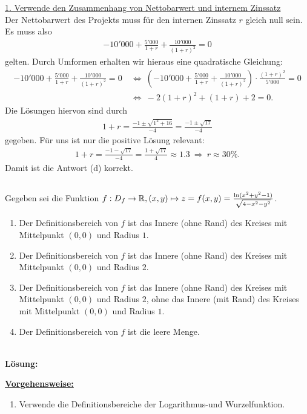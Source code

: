 \underline{1. Verwende den Zusammenhang von Nettobarwert und internem Zinssatz}\\
Der Nettobarwert des Projekts muss für den internen Zinssatz $ r $ gleich null sein.
Es muss also
\begin{align*}
	-10'000 + \frac{5'000}{1+ r} + \frac{10'000}{(1+r)^2} = 0
\end{align*}
gelten. Durch Umformen erhalten wir hieraus eine quadratische Gleichung:
\begin{align*}
	-10'000 + \frac{5'000}{1+ r} + \frac{10'000}{(1+r)^2} = 0
	\ &\Leftrightarrow \
	\left(
	-10'000 + \frac{5'000}{1+ r} + \frac{10'000}{(1+r)^2}
	\right)
	\cdot 
	\frac{(1+r)^2}{5'000}
	= 
	0\\
	\ &\Leftrightarrow \
	-2 (1+ r)^2 + (1+r) + 2
	= 
	0.
\end{align*}
Die Lösungen hiervon sind durch
\begin{align*}
	1+ r =
	\frac{-1 \pm \sqrt{1^2 + 16}}{-4}
	=
	\frac{-1 \pm \sqrt{17}}{-4}
\end{align*}
gegeben. Für uns ist nur die positive Lösung relevant:
\begin{align*}
	1+ r 
	= \frac{-1 -  \sqrt{17}}{-4} =
	\frac{1 +  \sqrt{17}}{4} 
	\approx 1.3
	\ \Rightarrow \
	r \approx 30 \%.
\end{align*}
Damit ist die Antwort (d) korrekt.
\newpage

\subsection*{}
Gegeben sei die Funktion $ f :D_f \to \mathbb{R}, (x,y) \mapsto z = f(x,y) = \frac{\ln(x^2 +y^2 -1)}{\sqrt{4 - x^2 - y^2}} $.
\renewcommand{\labelenumi}{(\alph{enumi})}
\begin{enumerate}
	\item 
	Der Definitionsbereich von $ f  $ ist das Innere (ohne Rand) des Kreises mit Mittelpunkt $ (0,0) $ und Radius $ 1 $.
	\item
	Der Definitionsbereich von $ f  $ ist das Innere (ohne Rand) des Kreises mit Mittelpunkt $ (0,0) $ und Radius $ 2 $.
	\item
	Der Definitionsbereich von $ f  $ ist das Innere (ohne Rand) des Kreises mit Mittelpunkt $ (0,0) $ und Radius $ 2 $, ohne das Innere (mit Rand) des Kreises mit Mittelpunkt $ (0,0) $ und Radius $ 1 $.
	\item
	Der Definitionsbereich von $ f  $ ist die leere Menge.
\end{enumerate}
\ \\
\textbf{Lösung:}
\begin{mdframed}
\underline{\textbf{Vorgehensweise:}}
\renewcommand{\labelenumi}{\theenumi.}
\begin{enumerate}
\item Verwende die Definitionsbereiche der Logarithmus-und Wurzelfunktion.
\end{enumerate}
\end{mdframed}

